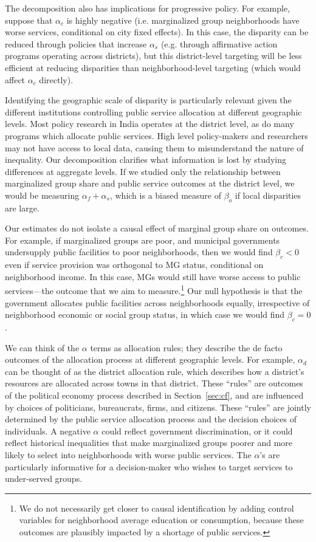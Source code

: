 \documentclass[12pt]{article}
\begin{document}
The decomposition also has implications for progressive policy. For example, suppose that $\alpha_c$ is highly negative (i.e. marginalized group neighborhoods have worse services, conditional on city fixed effects). In this case, the disparity can be reduced through policies that increase $\alpha_s$ (e.g. through affirmative action programs operating across districts), but this district-level targeting will be less efficient at reducing disparities than neighborhood-level targeting (which would affect $\alpha_c$ directly).

Identifying the geographic scale of disparity is particularly relevant given the different institutions controlling public service allocation at different geographic levels. Most policy research in India operates at the district level, as do many programs which allocate public services. High level policy-makers and researchers may not have access to local data, causing them to misunderstand the nature of inequality. Our decomposition clarifies what information is lost by studying differences at aggregate levels. If we studied only the relationship between marginalized group share and public service outcomes at the district level, we would be measuring $\alpha_f + \alpha_s$, which is a biased measure of $\beta_o$ if local disparities are large.

Our estimates do not isolate a causal effect of marginal group share on outcomes. For example, if marginalized groups are poor, and municipal governments undersupply public facilities to poor neighborhoods, then we would find $\beta_c < 0$ even if service provision was orthogonal to MG status, conditional on neighborhood income. In this case, MGs would still have worse access to public services---the outcome that we aim to measure.\footnote{We do not necessarily get closer to causal identification by adding control variables for neighborhood average education or consumption, because these outcomes are plausibly impacted by a shortage of public services.} Our null hypothesis is that the government allocates public facilities across neighborhoods equally, irrespective of neighborhood economic or social group status, in which case we would find $\beta_c = 0$.

We can think of the $\alpha$ terms as allocation rules; they describe the de facto outcomes of the allocation process at different geographic levels. For example, $\alpha_d$ can be thought of as the district allocation rule, which describes how a district's resources are allocated across towns in that district. These ``rules'' are outcomes of the political economy process described in Section~\ref{sec:cf}, and are influenced by choices of politicians, bureaucrats, firms, and citizens. These ``rules'' are jointly determined by the public service allocation process and the decision choices of individuals. A negative $\alpha$ could reflect government discrimination, or it could reflect historical inequalities that make marginalized groups poorer and more likely to select into neighborhoods with worse public services. The $\alpha$'s are particularly informative for a decision-maker who wishes to target services to under-served groups.
\end{document}
